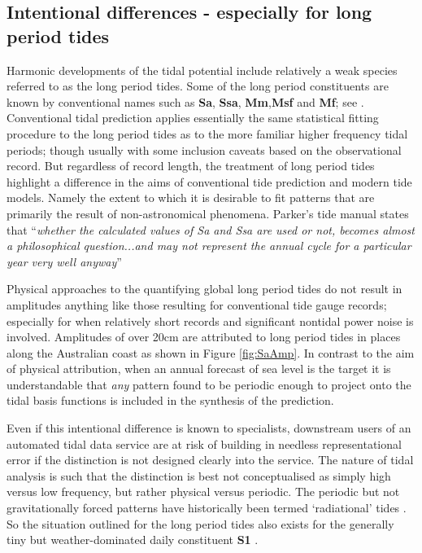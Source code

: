 \subsection{Intentional differences - especially for long period tides}
Harmonic developments of the tidal potential include relatively a weak species referred to as the long period tides.  Some of the long period constituents are known by conventional names such as \textbf{Sa}, \textbf{Ssa}, \textbf{Mm},\textbf{Msf} and \textbf{Mf}; see \citep[table 4]{agnew2015}.
Conventional tidal prediction applies essentially the same statistical fitting procedure to the long period tides as to the more familiar higher frequency tidal periods; though usually with some inclusion caveats based on the observational record. 
But regardless of record length, the treatment of long period tides highlight a difference in the aims of conventional tide prediction and modern tide models.   Namely the extent to which it is desirable to fit patterns that are primarily the result of non-astronomical phenomena.
Parker's tide manual states that ``\textit{whether the calculated values of Sa and Ssa are used or not, becomes almost a philosophical question...and may not represent the annual cycle for a particular year very well anyway}''  \citep[Section 3.7]{Parker:2007wq} 

Physical approaches to the quantifying global long period tides \citep{Egbert:1994wz} do not result in amplitudes anything like those resulting for conventional tide gauge records; especially for when relatively short records and significant nontidal power noise is involved.   Amplitudes of over 20cm are attributed to long period tides in places along the Australian coast as shown in Figure \ref{fig:SaAmp}. In contrast to the aim of physical attribution, when an annual forecast of sea level is the target it is understandable that \textit{any} pattern found to be periodic enough to project onto the tidal basis functions is included in the synthesis of the prediction. 

Even if this intentional difference is known to specialists, downstream users of an automated tidal data service are at risk of building in needless representational error if the distinction is not designed clearly into the service.
The nature of tidal analysis is such that the distinction is best not conceptualised as simply high versus low frequency, but rather physical versus periodic.   The periodic but not gravitationally forced patterns have historically been termed `radiational' tides \citep{agnew2015}.  So the situation outlined for the long period tides also exists for the generally tiny but weather-dominated daily constituent \textbf{S1} \citep{Ray:2004ts}.
 
